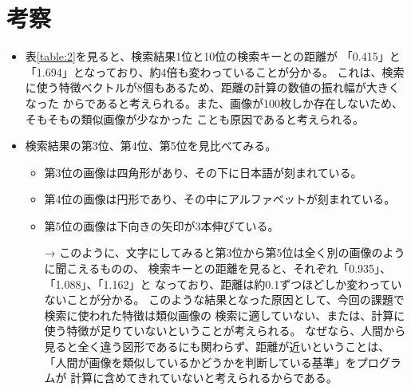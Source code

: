 \section{考察}

\begin{itemize}
  \item 表\ref{table:2}を見ると、検索結果1位と10位の検索キーとの距離が
  「0.415」と「1.694」となっており、約4倍も変わっていることが分かる。
  これは、検索に使う特徴ベクトルが8個もあるため、距離の計算の数値の振れ幅が大きくなった
  からであると考えられる。また、画像が100枚しか存在しないため、そもそもの類似画像が少なかった
  ことも原因であると考えられる。
  \item 検索結果の第3位、第4位、第5位を見比べてみる。
    \begin{itemize}
      \item 第3位の画像は四角形があり、その下に日本語が刻まれている。
      \item 第4位の画像は円形であり、その中にアルファベットが刻まれている。
      \item 第5位の画像は下向きの矢印が3本伸びている。
    \end{itemize}
    \begin{itemize}
      \item[→] このように、文字にしてみると第3位から第5位は全く別の画像のように聞こえるものの、
      検索キーとの距離を見ると、それぞれ「0.935」、「1.088」、「1.162」と
      なっており、距離は約0.1ずつほどしか変わっていないことが分かる。
      このような結果となった原因として、今回の課題で検索に使われた特徴は類似画像の
      検索に適していない、または、計算に使う特徴が足りていないということが考えられる。
      なぜなら、人間から見ると全く違う図形であるにも関わらず、距離が近いということは、
      「人間が画像を類似しているかどうかを判断している基準」をプログラムが
      計算に含めてきれていないと考えられるからである。
    \end{itemize}
    
\end{itemize}

